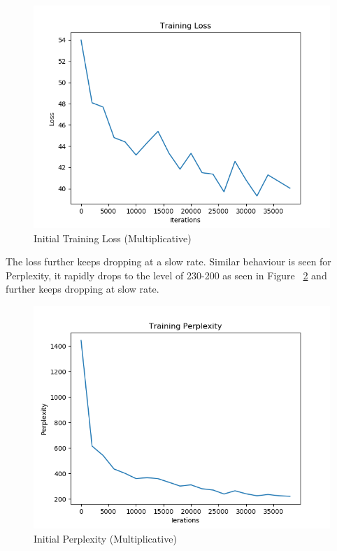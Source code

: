 \documentclass[11pt,a4paper]{article}
\begin{document}
\begin{figure}[!htbp]
\includegraphics[width=\linewidth]{de_mul_loss_1.png}
\caption{Initial Training Loss (Multiplicative)}
\label{fig17}
\end{figure}

The loss further keeps dropping at a slow rate. Similar behaviour is seen for Perplexity, it rapidly drops to the level of 230-200 as seen in Figure ~\ref{fig19} and further keeps dropping at slow rate.


\begin{figure}[!htbp]
\includegraphics[width=\linewidth]{de_mul_ppl_1.png}
\caption{Initial Perplexity (Multiplicative)}
\label{fig19}
\end{figure}
\end{document}
